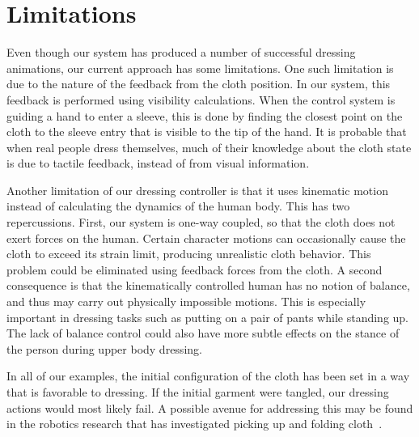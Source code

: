 \section{Limitations}

Even though our system has produced a number of successful dressing
animations, our current approach has some limitations.  One such
limitation is due to the nature of the feedback from the cloth position.
In our system, this feedback is performed using visibility calculations.
When the control system is guiding a hand to enter a sleeve, this is done
by finding the closest point on the cloth to the sleeve entry that is
visible to the tip of the hand.  It is probable that when real people
dress themselves, much of their knowledge about the cloth state is due
to tactile feedback, instead of from visual information.

Another limitation of our dressing controller is that it uses kinematic
motion instead of calculating the dynamics of the human body.  This has
two repercussions.  First, our system is one-way coupled, so that the
cloth does not exert forces on the human.  Certain character motions can
occasionally cause the cloth to exceed its strain limit, producing
unrealistic cloth behavior.  This problem could be eliminated using
feedback forces from the cloth.  A second consequence is that the
kinematically controlled human has no notion of balance, and thus may
carry out physically impossible motions.  This is especially important in
dressing tasks such as putting on a pair of pants while standing up.  The
lack of balance control could also have more subtle effects on the stance
of the person during upper body dressing.


In all of our examples, the initial configuration of the cloth has been
set in a way that is favorable to dressing.  If the initial garment were
tangled, our dressing actions would most likely fail.  A possible avenue
for addressing this may be found in the robotics research that has
investigated picking up and folding cloth~\cite{Cusumano:2011:BCD}.

